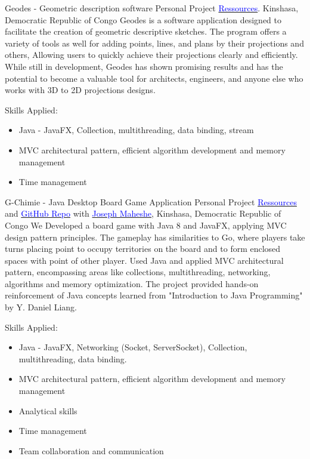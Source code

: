     {Geodes - Geometric description software}
    {Personal Project}
    {\href{https://disk.yandex.ru/d/mz6n2ciERA7q4Q}{\textcolor{blue}{Ressources}}. 
     Kinshasa, Democratic Republic of Congo
    }
    {
    \newline
    Geodes is a software application designed to facilitate the creation of geometric descriptive sketches.
    The program offers a variety of tools as well for adding points, lines, and plans by their projections and others,
    Allowing users to quickly achieve their projections clearly and efficiently. While still in development, Geodes has shown promising results and has the potential to become a valuable tool for architects,
    engineers, and anyone else who works with 3D to 2D projections designs.
    }
    {
    Skills Applied:
    \begin{itemize}
        \item Java - JavaFX,  Collection, multithreading, data binding, stream
        \item MVC architectural pattern, efficient algorithm development and memory management
        \item Time management
    \end{itemize}
    }


    {G-Chimie - Java Desktop Board Game Application}
    {Personal Project}
    {\href{https://disk.yandex.ru/d/mMRjdkn2VyuJEw}{\textcolor{blue}{Ressources}} and 
    \href{https://github.com/DanGlChris/G-Chimie}{\textcolor{blue}{GitHub Repo}} 
    with \href{linkedin.com/in/maheshejs}{\textcolor{blue}{Joseph Maheshe}},
    Kinshasa, Democratic Republic of Congo
    }
    {
    \newline
    We Developed a board game with Java 8 and JavaFX, applying MVC design pattern principles. 
    The gameplay has similarities to Go, where players take turns placing point to occupy 
    territories on the board and to form enclosed spaces with point of other player.
    Used Java and applied MVC architectural pattern, encompassing areas like collections, multithreading, networking, algorithms and memory optimization. 
    The project provided hands-on reinforcement of Java concepts learned from "Introduction to Java Programming" by Y. Daniel Liang.
    }
    {
    Skills Applied:
    \begin{itemize}
        \item Java - JavaFX, Networking (Socket, ServerSocket), Collection, multithreading, data binding.
        \item MVC architectural pattern, efficient algorithm development and memory management
        \item Analytical skills
        \item Time management
        \item Team collaboration and communication
    \end{itemize}
    }